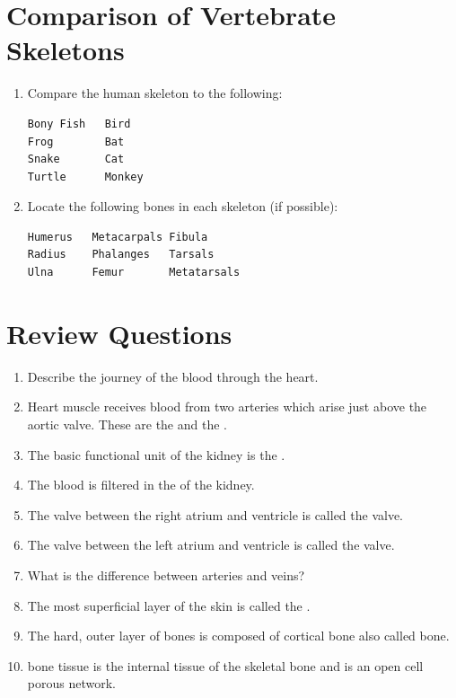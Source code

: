 \section{Comparison of Vertebrate
Skeletons}\label{comparison-of-vertebrate-skeletons}

\begin{enumerate}
\def\labelenumi{\arabic{enumi}.}
\item
  Compare the human skeleton to the following:

\begin{verbatim}
Bony Fish   Bird
Frog        Bat
Snake       Cat
Turtle      Monkey
\end{verbatim}
\item
  Locate the following bones in each skeleton (if possible):

\begin{verbatim}
Humerus   Metacarpals Fibula
Radius    Phalanges   Tarsals
Ulna      Femur       Metatarsals
\end{verbatim}
\end{enumerate}

\section{Review Questions}\label{review-questions-9}

\begin{enumerate}
\def\labelenumi{\arabic{enumi}.}
\tightlist
\item
  Describe the journey of the blood through the heart.
\item
  Heart muscle receives blood from two arteries which arise just above
  the aortic valve. These are the \underline{\phantom{answer}} and the
  \underline{\phantom{answer}}.
\item
  The basic functional unit of the kidney is the
  \underline{\phantom{answer}}.
\item
  The blood is filtered in the \underline{\phantom{answer}} of the kidney.
\item
  The valve between the right atrium and ventricle is called the
  \underline{\phantom{answer}} valve.
\item
  The valve between the left atrium and ventricle is called the
  \underline{\phantom{answer}} valve.
\item
  What is the difference between arteries and veins?
\item
  The most superficial layer of the skin is called the
\underline{\phantom{answer}}.
\item
  The hard, outer layer of bones is composed of cortical bone also
  called \underline{\phantom{answer}} bone.
\item
  \underline{\phantom{answer}} bone tissue is the internal tissue of the
  skeletal bone and is an open cell porous network.  
\end{enumerate}
